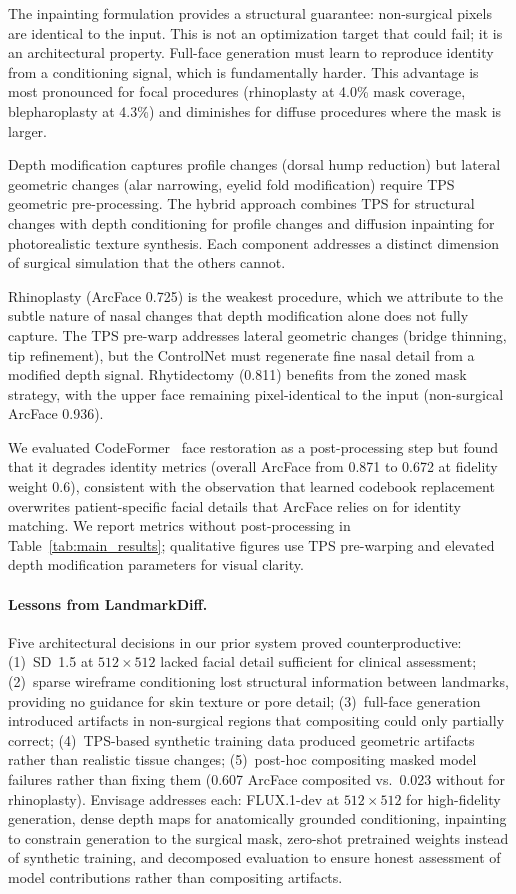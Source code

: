 \documentclass[runningheads]{llncs}
\newcommand{\method}{Envisage}
\begin{document}
The inpainting formulation provides a structural guarantee: non-surgical
pixels are identical to the input. This is not an optimization target
that could fail; it is an architectural property. Full-face generation
must learn to reproduce identity from a conditioning signal, which is
fundamentally harder. This advantage is most pronounced for focal
procedures (rhinoplasty at 4.0\% mask coverage, blepharoplasty at 4.3\%)
and diminishes for diffuse procedures where the mask is larger.

Depth modification captures profile changes (dorsal hump reduction) but
lateral geometric changes (alar narrowing, eyelid fold modification)
require TPS geometric pre-processing. The hybrid approach combines TPS
for structural changes with depth conditioning for profile changes and
diffusion inpainting for photorealistic texture synthesis. Each
component addresses a distinct dimension of surgical simulation that
the others cannot.

Rhinoplasty (ArcFace 0.725) is the weakest procedure, which we
attribute to the subtle nature of nasal changes that depth modification
alone does not fully capture. The TPS pre-warp addresses lateral
geometric changes (bridge thinning, tip refinement), but the ControlNet
must regenerate fine nasal detail from a modified depth signal.
Rhytidectomy (0.811) benefits from the zoned mask strategy, with the
upper face remaining pixel-identical to the input (non-surgical ArcFace
0.936).

We evaluated CodeFormer~\cite{wang2023codeformer} face restoration as
a post-processing step but found that it degrades identity metrics
(overall ArcFace from 0.871 to 0.672 at fidelity weight 0.6),
consistent with the observation that learned codebook replacement
overwrites patient-specific facial details that ArcFace relies on for
identity matching. We report
metrics without post-processing in Table~\ref{tab:main_results};
qualitative figures use TPS pre-warping and elevated depth modification
parameters for visual clarity.

\paragraph{Lessons from LandmarkDiff.}
Five architectural decisions in our prior system proved counterproductive:
(1)~SD~1.5 at $512 \times 512$ lacked facial detail sufficient for
clinical assessment; (2)~sparse wireframe conditioning lost structural
information between landmarks, providing no guidance for skin texture or
pore detail; (3)~full-face generation introduced artifacts in non-surgical
regions that compositing could only partially correct; (4)~TPS-based
synthetic training data produced geometric artifacts rather than realistic
tissue changes; (5)~post-hoc compositing masked model failures rather than
fixing them (0.607 ArcFace composited vs.\ 0.023 without for rhinoplasty). \method{}
addresses each: FLUX.1-dev at $512 \times 512$ for high-fidelity
generation, dense depth maps for anatomically grounded conditioning,
inpainting to constrain generation to the surgical mask, zero-shot
pretrained weights instead of synthetic training, and decomposed evaluation
to ensure honest assessment of model contributions rather than compositing
artifacts.
\end{document}
